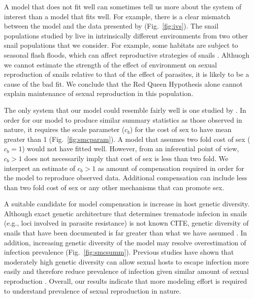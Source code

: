 \documentclass{article}\usepackage[]{graphicx}\usepackage[]{color}
\newcommand{\fref}[1]{Fig.~\ref{fig:#1}}
\begin{document}
A model that does not fit well can sometimes tell us more about the system of interest than a model that fits well.
For example, there is a clear mismatch between the model and the data presented by \cite{dagan2013clonal} (\fref{ivs}).
The snail populations studied by \cite{dagan2013clonal} live in intrinsically different environments from two other snail populations that we consider.
For example, some habitats are subject to seasonal flash floods, which can affect reproductive strategies of snails \citep{ben2007temporal}.
Althuogh we cannot estimate the strength of the effect of environment on sexual reproduction of snails relative to that of the effect of parasites, it is likely to be a cause of the bad fit.
We conclude that the Red Queen Hypothesis alone cannot explain maintenance of sexual reproduction in this population.

The only system that our model could resemble fairly well is one studied by \cite{vergara2014infection}.
In order for our model to produce similar summary statistics as those observed in nature, it requires the scale parameter ($c_b$) for the cost of sex to have mean greater than 1 (\fref{smcparam}).
A model that assumes two fold cost of sex ($c_b=1$) would not have fitted well.
However, from an inferential point of view, $c_b > 1$ does not necessarily imply that cost of sex is less than two fold.
We interpret an estimate of $c_b > 1$ as amount of compensation required in order for the model to reproduce observed data.
Additional compensation can include less than two fold cost of sex or any other mechanisms that can promote sex.

A suitable candidate for model compensation is increase in host genetic diversity.
Although exact genetic architecture that determines trematode infecion in snails (e.g., loci involved in parasite resistance) is not known {CITE}, genetic diversity of snails that have been documented is far greater than what we have assumed \citep{king2011parasites, dagan2013clonal}.
In addition, increasing genetic diversity of the model may resolve overestimation of infection prevalence (\fref{smcsumm}).
Previous studies have shown that moderately high genetic diversity can allow sexual hosts to escape infection more easily and therefore reduce prevalence of infection given similar amount of sexual reproduction \citep{lively2010effect, king2012does, ashby2015diversity}.
Overall, our results indicate that more modeling effort is required to understand prevalence of sexual reproduction in nature.
\end{document}
